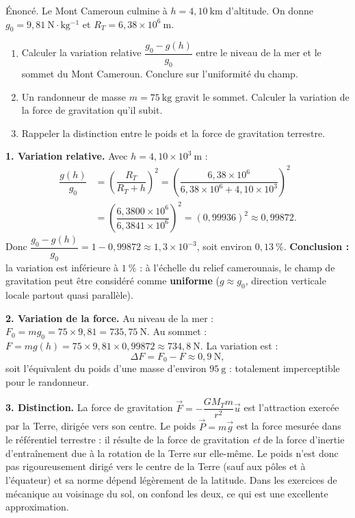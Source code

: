 \documentclass[11pt]{article}
\newcommand{\cle}[1]{{\popxbold\color{popdark}#1}}
\begin{document}
\begin{exoresolu}
Énoncé. Le Mont Cameroun culmine à $h = 4{,}10\ \mathrm{km}$ d'altitude. On donne $g_0 = 9{,}81\ \mathrm{N\cdot kg^{-1}}$ et $R_T = 6{,}38\times 10^{6}\ \mathrm{m}$.
\begin{enumerate}
\item Calculer la variation relative $\dfrac{g_0 - g(h)}{g_0}$ entre le niveau de la mer et le sommet du Mont Cameroun. Conclure sur l'uniformité du champ.
\item Un randonneur de masse $m = 75\ \mathrm{kg}$ gravit le sommet. Calculer la variation de la force de gravitation qu'il subit.
\item Rappeler la distinction entre le poids et la force de gravitation terrestre.
\end{enumerate}
\tcblower
\textbf{1. Variation relative.} Avec $h = 4{,}10\times 10^{3}\ \mathrm{m}$ :
\begin{align*}
\dfrac{g(h)}{g_0} &= \left(\dfrac{R_T}{R_T+h}\right)^2 = \left(\dfrac{6{,}38\times 10^{6}}{6{,}38\times 10^{6}+4{,}10\times 10^{3}}\right)^2 \\
&= \left(\dfrac{6{,}3800\times 10^{6}}{6{,}3841\times 10^{6}}\right)^2 = (0{,}99936)^2 \approx 0{,}99872.
\end{align*}
Donc $\dfrac{g_0 - g(h)}{g_0} = 1 - 0{,}99872 \approx 1{,}3\times 10^{-3}$, soit environ $0{,}13\ \%$.
\textbf{Conclusion :} la variation est inférieure à $1\ \%$ : à l'échelle du relief camerounais, le champ de gravitation peut être considéré comme \textbf{uniforme} ($g \approx g_0$, direction verticale locale partout quasi parallèle).

\textbf{2. Variation de la force.} Au niveau de la mer : $F_0 = m g_0 = 75\times 9{,}81 = 735{,}75\ \mathrm{N}$. Au sommet : $F = m g(h) = 75\times 9{,}81\times 0{,}99872 \approx 734{,}8\ \mathrm{N}$. La variation est :
\[ \Delta F = F_0 - F \approx 0{,}9\ \mathrm{N}, \]
soit l'équivalent du poids d'une masse d'environ $95\ \mathrm{g}$ : totalement imperceptible pour le randonneur.

\textbf{3. Distinction.} La \cle{force de gravitation} $\vec{F} = -\dfrac{GM_T m}{r^2}\vec{u}$ est l'attraction exercée par la Terre, dirigée vers son centre. Le \cle{poids} $\vec{P} = m\vec{g}$ est la force mesurée dans le référentiel terrestre : il résulte de la force de gravitation \emph{et} de la force d'inertie d'entraînement due à la rotation de la Terre sur elle-même. Le poids n'est donc pas rigoureusement dirigé vers le centre de la Terre (sauf aux pôles et à l'équateur) et sa norme dépend légèrement de la latitude. Dans les exercices de mécanique au voisinage du sol, on confond les deux, ce qui est une excellente approximation.
\end{exoresolu}
\end{document}
